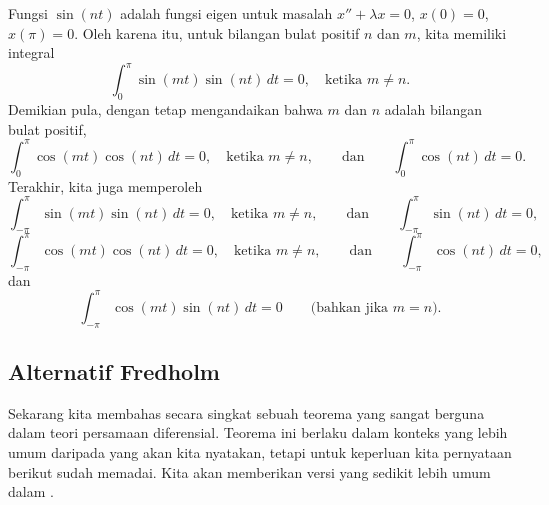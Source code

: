 Fungsi $\sin (n t)$ adalah fungsi eigen untuk masalah
$x''+\lambda x = 0$, $x(0) = 0$, $x(\pi) = 0$.
Oleh karena itu, untuk bilangan bulat positif
$n$ dan $m$, kita memiliki integral
\begin{equation*}
\int_{0}^\pi \sin (mt) \sin (nt) \,dt = 0 ,
\quad
\text{ketika } m \neq n.
\end{equation*}
Demikian pula, dengan tetap mengandaikan bahwa $m$ dan $n$ adalah bilangan bulat
positif,
\begin{equation*}
\int_{0}^\pi \cos (mt) \cos (nt) \,dt = 0 ,
\quad
\text{ketika } m \neq n,
\qquad \text{dan} \qquad
\int_{0}^\pi  \cos (nt) \,dt = 0 .
\end{equation*}
Terakhir, kita juga memperoleh
\begin{equation*}
\int_{-\pi}^\pi \sin (mt) \sin (nt) \,dt = 0 ,
\quad
\text{ketika } m \neq n, 
\qquad \text{dan} \qquad
\int_{-\pi}^\pi  \sin (nt) \,dt = 0 ,
\end{equation*}
\begin{equation*}
\int_{-\pi}^\pi \cos (mt) \cos (nt) \,dt = 0 ,
\quad
\text{ketika } m \neq n,
\qquad \text{dan} \qquad
\int_{-\pi}^\pi  \cos (nt) \,dt = 0 ,
\end{equation*}
dan
\begin{equation*}
\int_{-\pi}^\pi \cos (mt) \sin (nt) \,dt = 0 
\qquad \text{(bahkan jika $m=n$).}
\end{equation*}

%



\subsection{Alternatif Fredholm}

Sekarang kita membahas secara singkat sebuah teorema yang sangat berguna dalam teori persamaan
diferensial.  Teorema ini berlaku dalam konteks yang lebih umum daripada yang akan
kita nyatakan, tetapi untuk keperluan kita pernyataan berikut sudah
memadai.  Kita akan memberikan versi yang sedikit lebih umum dalam
.

